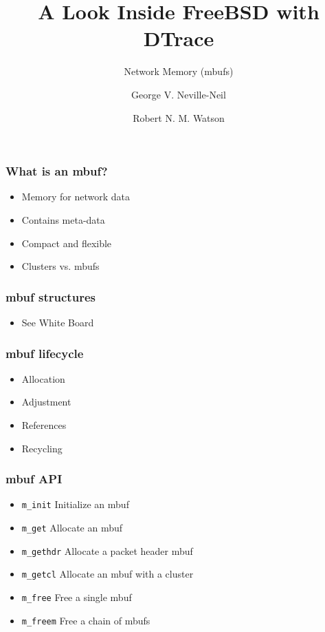 \documentclass[pdftex]{beamer}
\begin{document}

\title{A Look Inside FreeBSD with DTrace}
\subtitle{Network Memory (mbufs)}
\author[shortname]{George V. Neville-Neil \and Robert N. M. Watson}

\begin{frame}
  \titlepage
\end{frame}

\begin{frame}
  \frametitle{What is an mbuf?}
  \begin{itemize}
  \item Memory for network data 
  \item Contains meta-data
  \item Compact and flexible
  \item Clusters vs. mbufs
  \end{itemize}
\end{frame}

\begin{frame}
  \frametitle{mbuf structures}
  \begin{itemize}
    \item \large See White Board
  \end{itemize}
\end{frame}

\begin{frame}
  \frametitle{mbuf lifecycle}
  \begin{itemize}
  \item Allocation
  \item Adjustment
  \item References
  \item Recycling
  \end{itemize}
\end{frame}

\begin{frame}[fragile]
  \frametitle{mbuf API}
  \begin{itemize}
  \item \verb|m_init| Initialize an mbuf
  \item \verb|m_get| Allocate an mbuf
  \item \verb|m_gethdr| Allocate a packet header mbuf 
  \item \verb|m_getcl| Allocate an mbuf with a cluster
  \item \verb|m_free| Free a single mbuf
  \item \verb|m_freem| Free a chain of mbufs
  \end{itemize}
\end{frame}
\end{document}
